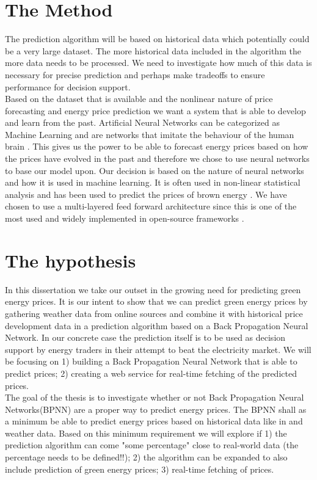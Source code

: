 \documentclass[twoside,11pt,openright]{report}
\begin{document}
\section{The Method}
The prediction algorithm will be based on historical data which potentially could be a very large dataset. The more historical data included in the algorithm the more data needs to be processed. We need to investigate how much of this data is necessary for precise prediction and perhaps make tradeoffs to ensure performance for decision support.
\\[0.5cm] 
Based on the dataset that is available and the nonlinear nature of price forecasting and energy price prediction we want a system that is able to develop and learn from the past. Artificial Neural Networks can be categorized as Machine Learning \cite{18} and are networks that imitate the behaviour of the human brain \cite{1}. This gives us the power to be able to forecast energy prices based on how the prices have evolved in the past and therefore we chose to use neural networks to base our model upon. Our decision is based on the nature of neural networks and how it is used in machine learning. It is often used in non-linear statistical analysis \cite{16} and has been used to predict the prices of brown energy \cite{2}\cite{3}. We have chosen to use a multi-layered feed forward architecture since this is one of the most used and widely implemented in open-source frameworks \cite{17}.

\section{The hypothesis}
In this dissertation we take our outset in the growing need for predicting green energy prices. It is our intent to show that we can predict green energy prices by gathering weather data from online sources and combine it with historical price development data in a prediction algorithm based on a Back Propagation Neural Network. In our concrete case the prediction itself is to be used as decision support by energy traders in their attempt to beat the electricity market. We will be focusing on 1) building a Back Propagation Neural Network that is able to predict prices; 2) creating a web service for real-time fetching of the predicted prices. 
\\[0.5cm] 
The goal of the thesis is to investigate whether or not Back Propagation Neural Networks(BPNN) are a proper way to predict energy prices. The BPNN shall as a minimum be able to predict energy prices based on historical data like in \cite{2} and weather data. Based on this minimum requirement we will explore if 1) the prediction algorithm can come "some percentage" close to real-world data (the percentage needs to be defined!!); 2) the algorithm can be expanded to also include prediction of green energy prices; 3) real-time fetching of prices.
\end{document}
